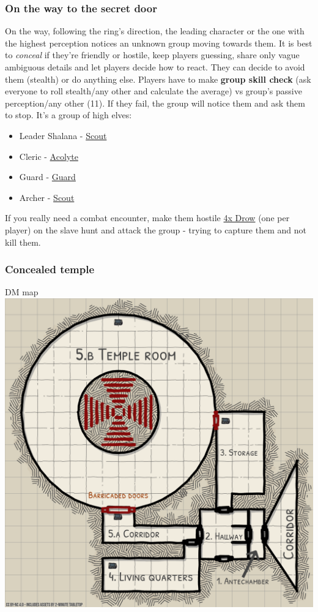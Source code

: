 \documentclass[10pt,onecolumn,twoside,openany,bg=full,layout=true]{dndbook}
\begin{document}
\subsubsection{On the way to the secret door}
On the way, following the ring's direction, the leading character
or the one with the highest perception notices an unknown group moving towards them.
It is best to \emph{conceal} if they're friendly or hostile, keep players guessing, share only vague ambiguous details and let players decide how to react.
They can decide to avoid them (stealth) or do anything else.
Players have to make \textbf{group skill check} (ask everyone to roll stealth/any other and calculate the average) vs group's passive perception/any other (11).
If they fail, the group will notice them and ask them to stop.
It's a group of high elves:
\begin{itemize}
  \item Leader Shalana - \href{https://www.dndbeyond.com/monsters/17007-scout}{Scout}
  \item Cleric - \href{https://www.dndbeyond.com/monsters/16763-acolyte}{Acolyte}
  \item Guard - \href{https://www.dndbeyond.com/monsters/16915-guard}{Guard}
  \item Archer - \href{https://www.dndbeyond.com/monsters/17007-scout}{Scout}
\end{itemize}

If you really need a combat encounter, make them hostile \href{https://www.dndbeyond.com/monsters/17133-drow}{4x Drow}
(one per player) on the slave hunt and attack the group - trying to capture them and not kill them.

\subsubsection{Concealed temple}
DM map
\includegraphics[width=1\textwidth]{img/dm_ruined_temple_map_19x19}
\end{document}
